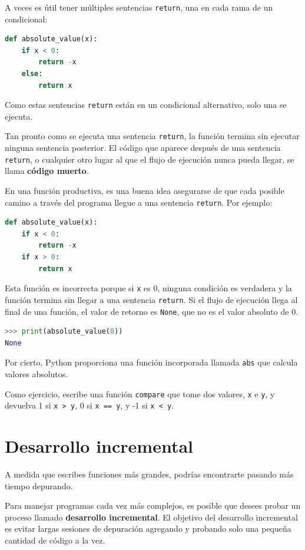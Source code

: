 A veces es útil tener múltiples sentencias \texttt{return}, una en cada rama de un condicional:

\begin{lstlisting}[language=Python]
def absolute_value(x):
    if x < 0:
        return -x
    else:
        return x
\end{lstlisting}

Como estas sentencias \texttt{return} están en un condicional alternativo, solo una se ejecuta.

Tan pronto como se ejecuta una sentencia \texttt{return}, la función termina sin ejecutar ninguna sentencia posterior. El código que aparece después de una sentencia \texttt{return}, o cualquier otro lugar al que el flujo de ejecución nunca pueda llegar, se llama \textbf{código muerto}.

En una función productiva, es una buena idea asegurarse de que cada posible camino a través del programa llegue a una sentencia \texttt{return}. Por ejemplo:

\begin{lstlisting}[language=Python]
def absolute_value(x):
    if x < 0:
        return -x
    if x > 0:
        return x
\end{lstlisting}

Esta función es incorrecta porque si \texttt{x} es 0, ninguna condición es verdadera y la función termina sin llegar a una sentencia \texttt{return}. Si el flujo de ejecución llega al final de una función, el valor de retorno es \texttt{None}, que no es el valor absoluto de 0.

\begin{lstlisting}[language=Python]
>>> print(absolute_value(0))
None
\end{lstlisting}

Por cierto, Python proporciona una función incorporada llamada \texttt{abs} que calcula valores absolutos.

Como ejercicio, escribe una función \texttt{compare} que tome dos valores, \texttt{x} e \texttt{y}, y devuelva 1 si \texttt{x > y}, 0 si \texttt{x == y}, y -1 si \texttt{x < y}.

\section{Desarrollo incremental}

A medida que escribes funciones más grandes, podrías encontrarte pasando más tiempo depurando.

Para manejar programas cada vez más complejos, es posible que desees probar un proceso llamado \textbf{desarrollo incremental}. El objetivo del desarrollo incremental es evitar largas sesiones de depuración agregando y probando solo una pequeña cantidad de código a la vez.

